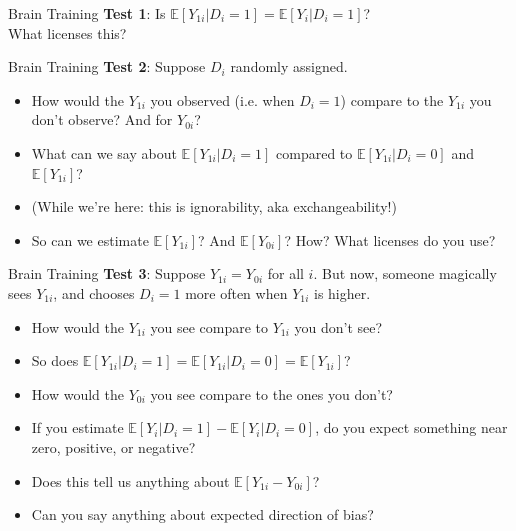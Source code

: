 \documentclass[xcolor=dvipsnames]{beamer}
\newcommand\E{\mathbb{E}}
\begin{document}
\begin{frame}{Brain Training}
\textbf{Test 1}: Is $\E[Y_{1i}|D_i=1]=\E[Y_i|D_i=1]$?\\

\bigskip
{} What licenses this?

\end{frame}

\begin{frame}{Brain Training}
 \textbf{Test 2}: Suppose $D_i$ randomly assigned. 
\small
\begin{itemize}
\item<2-> How would the $Y_{1i}$ you observed (i.e. when $D_i=1$) compare to the $Y_{1i}$ you don't observe? And for $Y_{0i}$?
\bigskip
\item<3-> What can we say about $\E[Y_{1i}|D_i=1]$ compared to $\E[Y_{1i}|D_i=0]$ and $\E[Y_{1i}]$?
\bigskip
\item<4->[] (While we're here: this is ignorability, aka exchangeability!)
\bigskip
\item<5-> So can we estimate $\E[Y_{1i}]$? And $\E[Y_{0i}]$?  How? What licenses do you use?
\end{itemize}
\end{frame}


\begin{frame}{Brain Training}
{} \textbf{Test 3}: Suppose $Y_{1i}=Y_{0i}$ for all $i$. But now, someone magically sees $Y_{1i}$, and chooses $D_i=1$ more often when $Y_{1i}$ is higher.
\small
\begin{itemize}
\item<2-> How would the $Y_{1i}$ you see compare to $Y_{1i}$ you don't see? 
\smallskip
\item<3-> So does $\E[Y_{1i}|D_i=1]=\E[Y_{1i}|D_i=0]=\E[Y_{1i}]$? 
\smallskip
\item<4-> How would the $Y_{0i}$ you see compare to the ones you don't?
\item<5-> If you estimate $\E[Y_i|D_i=1]-\E[Y_i|D_i=0]$, do you expect something near zero, positive, or negative? 
\item<6-> Does this tell us anything about $\E[Y_{1i}-Y_{0i}]$?
\item<7-> Can you say anything about expected direction of bias?
\end{itemize}
\end{frame}
\end{document}
